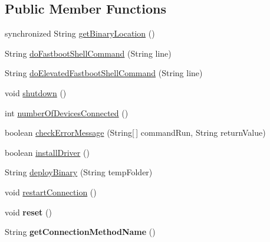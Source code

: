 \subsection*{Public Member Functions}
\begin{DoxyCompactItemize}
\item 
synchronized String \hyperlink{class_c_a_s_u_a_l_1_1communicationstools_1_1fastboot_1_1_fastboot_tools_a0d097e91058ad5e3044a57f59f3a9b66}{get\-Binary\-Location} ()
\item 
String \hyperlink{class_c_a_s_u_a_l_1_1communicationstools_1_1fastboot_1_1_fastboot_tools_a2255ac9ccc09b18fc555df63a6896beb}{do\-Fastboot\-Shell\-Command} (String line)
\item 
String \hyperlink{class_c_a_s_u_a_l_1_1communicationstools_1_1fastboot_1_1_fastboot_tools_af003ab47f7135092eb61125149383092}{do\-Elevated\-Fastboot\-Shell\-Command} (String line)
\item 
void \hyperlink{class_c_a_s_u_a_l_1_1communicationstools_1_1fastboot_1_1_fastboot_tools_a6de34295662b787efdc2a224fe16ae17}{shutdown} ()
\item 
int \hyperlink{class_c_a_s_u_a_l_1_1communicationstools_1_1fastboot_1_1_fastboot_tools_ad02d565e0fcc303feee9b27bc0df226e}{number\-Of\-Devices\-Connected} ()
\item 
boolean \hyperlink{class_c_a_s_u_a_l_1_1communicationstools_1_1fastboot_1_1_fastboot_tools_adf2300cad8f26c288225e7fc8ba93d61}{check\-Error\-Message} (String\mbox{[}$\,$\mbox{]} command\-Run, String return\-Value)
\item 
boolean \hyperlink{class_c_a_s_u_a_l_1_1communicationstools_1_1fastboot_1_1_fastboot_tools_aa340f086c997154a4392ec5eba25609a}{install\-Driver} ()
\item 
String \hyperlink{class_c_a_s_u_a_l_1_1communicationstools_1_1fastboot_1_1_fastboot_tools_aafba4b9d791ba42c88a1a46fa8af8e3f}{deploy\-Binary} (String temp\-Folder)
\item 
void \hyperlink{class_c_a_s_u_a_l_1_1communicationstools_1_1fastboot_1_1_fastboot_tools_ae184d155d0308cf12171d4a3e92de6f3}{restart\-Connection} ()
\item 
\hypertarget{class_c_a_s_u_a_l_1_1communicationstools_1_1fastboot_1_1_fastboot_tools_a969b74a1ac4e0e4e3abfd050c8185a2d}{void {\bfseries reset} ()}\label{class_c_a_s_u_a_l_1_1communicationstools_1_1fastboot_1_1_fastboot_tools_a969b74a1ac4e0e4e3abfd050c8185a2d}

\item 
\hypertarget{class_c_a_s_u_a_l_1_1communicationstools_1_1fastboot_1_1_fastboot_tools_a9678592d9da4804da844231e93bf695b}{String {\bfseries get\-Connection\-Method\-Name} ()}\label{class_c_a_s_u_a_l_1_1communicationstools_1_1fastboot_1_1_fastboot_tools_a9678592d9da4804da844231e93bf695b}


\end{DoxyCompactItemize}
